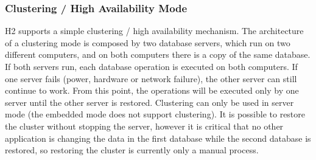 				\subsubsection{Clustering / High Availability Mode}

H2 supports a simple clustering / high availability mechanism. The architecture of a clustering mode is composed by two database servers, which run on two different computers, and on both computers there is a copy of the same database. If both servers run, each database operation is executed on both computers. If one server fails (power, hardware or network failure), the other server can still continue to work. From this point, the operations will be executed only by one server until the other server is restored. Clustering can only be used in server mode (the embedded mode does not support clustering). It is possible to restore the cluster without stopping the server, however it is critical that no other application is changing the data in the first database while the second database is restored, so restoring the cluster is currently only a manual process.


